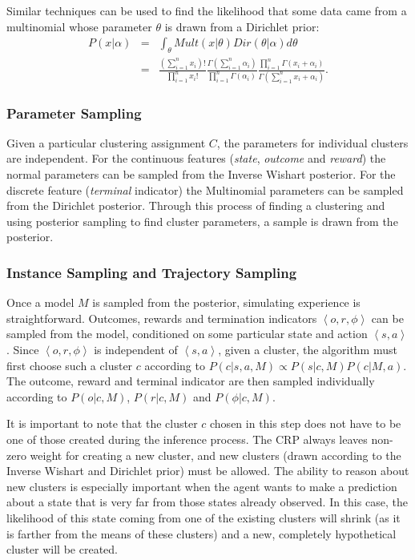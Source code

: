 Similar techniques can be used to find the likelihood that some data came from a multinomial whose parameter $\theta$ is drawn from a Dirichlet prior:
\begin{eqnarray*}
P(x|\alpha) &=& \int_\theta Mult(x|\theta)Dir(\theta|\alpha)d\theta\\
&=&\frac{(\sum_{i=1}^n x_i)!}{\prod_{i=1}^n x_i!} \frac{\Gamma(\sum_{i=1}^n \alpha_i)}{\prod_{i=1}^n\Gamma(\alpha_i)} \frac{\prod_{i=1}^n\Gamma(x_i+\alpha_i)}{\Gamma(\sum_{i=1}^n x_i+\alpha_i)}.
\end{eqnarray*}
\subsubsection{Parameter Sampling}

Given a particular clustering assignment $C$, the parameters for individual clusters are independent.  For the continuous features (\emph{state}, \emph{outcome} and \emph{reward}) the normal parameters can be sampled from the Inverse Wishart posterior. For the discrete feature (\emph{terminal} indicator) the Multinomial parameters can be sampled from the Dirichlet posterior. Through this process of finding a clustering and using posterior sampling to find cluster parameters, a sample is drawn from the  posterior.

\subsubsection{Instance Sampling and Trajectory Sampling}

Once a model $M$ is sampled from the  posterior, simulating experience is straightforward. Outcomes, rewards and termination indicators $\left<o,r,\phi\right>$ can be sampled from the model, conditioned on some particular state and action $\left<s,a\right>$. Since $\left<o,r,\phi\right>$ is independent of $\left<s,a\right>$, given a cluster, the algorithm must first choose such a cluster $c$ according to $P(c|s,a,M)\propto P(s|c,M)P(c|M,a)$. The outcome, reward and terminal indicator are then sampled individually according to $P(o|c,M)$, $P(r|c,M)$ and $P(\phi|c,M)$.

It is important to note that the cluster $c$ chosen in this step does not have to be one of those created during the inference process. The CRP always leaves non-zero weight for creating a new cluster, and new clusters (drawn according to the Inverse Wishart and Dirichlet prior) must be allowed. The ability to reason about new clusters is especially important when the agent wants to make a prediction about a state that is very far from those states already observed. In this case, the likelihood of this state coming from one of the existing clusters will shrink (as it is farther from the means of these clusters) and a new, completely hypothetical cluster will be created.

